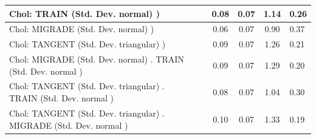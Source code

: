 \begin{table}
\begin{center}
\begin{tabular}{|l|l|c|c|c|l|}
			\hline
			 Chol: TRAIN (Std. Dev. normal) ) &  & 0.08 & 0.07 & 1.14 & 0.26 \\
			\hline
			 Chol: MIGRADE (Std. Dev. normal) ) &  & 0.06 & 0.07 & 0.90 & 0.37 \\
			\hline
			 Chol: TANGENT (Std. Dev. triangular) ) &  & 0.09 & 0.07 & 1.26 & 0.21 \\
			\hline
			 Chol: MIGRADE (Std. Dev. normal) . TRAIN (Std. Dev.   normal ) &  & 0.09 & 0.07 & 1.29 & 0.20 \\
			\hline
			 Chol: TANGENT (Std. Dev. triangular) . TRAIN (Std. Dev.   normal ) &  & 0.08 & 0.07 & 1.04 & 0.30 \\
			\hline
			 Chol: TANGENT (Std. Dev. triangular) . MIGRADE (Std. Dev.   normal ) &  & 0.10 & 0.07 & 1.33 & 0.19 \\
			\hline
		\end{tabular}
	\end{center}
\end{table}